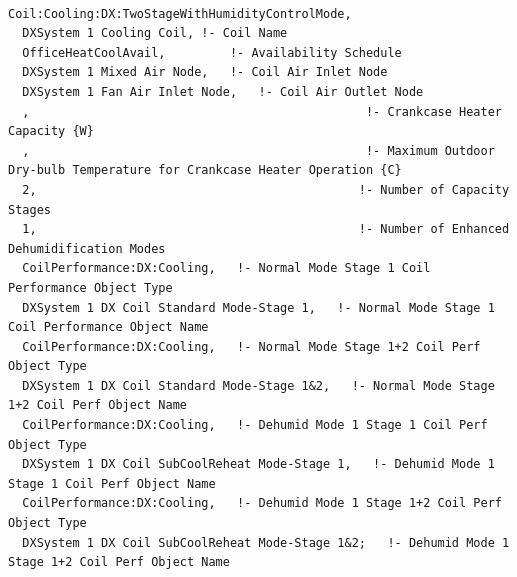 \begin{lstlisting}

Coil:Cooling:DX:TwoStageWithHumidityControlMode,
  DXSystem 1 Cooling Coil, !- Coil Name
  OfficeHeatCoolAvail,         !- Availability Schedule
  DXSystem 1 Mixed Air Node,   !- Coil Air Inlet Node
  DXSystem 1 Fan Air Inlet Node,   !- Coil Air Outlet Node
  ,                                               !- Crankcase Heater Capacity {W}
  ,                                               !- Maximum Outdoor Dry-bulb Temperature for Crankcase Heater Operation {C}
  2,                                             !- Number of Capacity Stages
  1,                                             !- Number of Enhanced Dehumidification Modes
  CoilPerformance:DX:Cooling,   !- Normal Mode Stage 1 Coil Performance Object Type
  DXSystem 1 DX Coil Standard Mode-Stage 1,   !- Normal Mode Stage 1 Coil Performance Object Name
  CoilPerformance:DX:Cooling,   !- Normal Mode Stage 1+2 Coil Perf Object Type
  DXSystem 1 DX Coil Standard Mode-Stage 1&2,   !- Normal Mode Stage 1+2 Coil Perf Object Name
  CoilPerformance:DX:Cooling,   !- Dehumid Mode 1 Stage 1 Coil Perf Object Type
  DXSystem 1 DX Coil SubCoolReheat Mode-Stage 1,   !- Dehumid Mode 1 Stage 1 Coil Perf Object Name
  CoilPerformance:DX:Cooling,   !- Dehumid Mode 1 Stage 1+2 Coil Perf Object Type
  DXSystem 1 DX Coil SubCoolReheat Mode-Stage 1&2;   !- Dehumid Mode 1 Stage 1+2 Coil Perf Object Name



\end{lstlisting}
